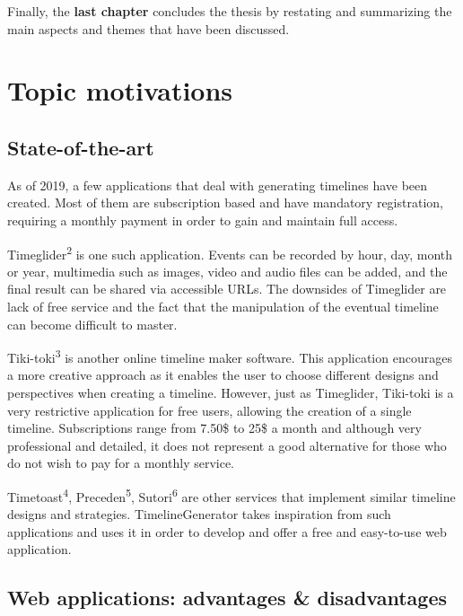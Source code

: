 \documentclass{report}
\begin{document}
Finally, the \textbf{last chapter} concludes the thesis by restating and summarizing the main aspects and themes that have been discussed.

\newpage

\chapter {Topic motivations}

\section {State-of-the-art}

As of 2019, a few applications that deal with generating timelines have been created. Most of them are subscription based and have mandatory registration, requiring a monthly payment in order to gain and maintain full access.\par

Timeglider\textsuperscript{2} is one such application. Events can be recorded by hour, day, month or year, multimedia such as images, video and audio files can be added, and the final result can be shared via accessible URLs. The downsides of Timeglider are lack of free service and the fact that the manipulation of the eventual timeline can become difficult to master.\par

Tiki-toki\textsuperscript{3} is another online timeline maker software. This application encourages a more creative approach as it enables the user to choose different designs and perspectives when creating a timeline. However, just as Timeglider, Tiki-toki is a very restrictive application for free users, allowing the creation of a single timeline. Subscriptions range from 7.50\$ to 25\$ a month and although very professional and detailed, it does not represent a good alternative for those who do not wish to pay for a monthly service.\par

Timetoast\textsuperscript{4}, Preceden\textsuperscript{5}, Sutori\textsuperscript{6} are other services that implement similar timeline designs and strategies. TimelineGenerator takes inspiration from such applications and uses it in order to develop and offer a free and easy-to-use web application.\par

\section {Web applications: advantages \& disadvantages}
\end{document}
